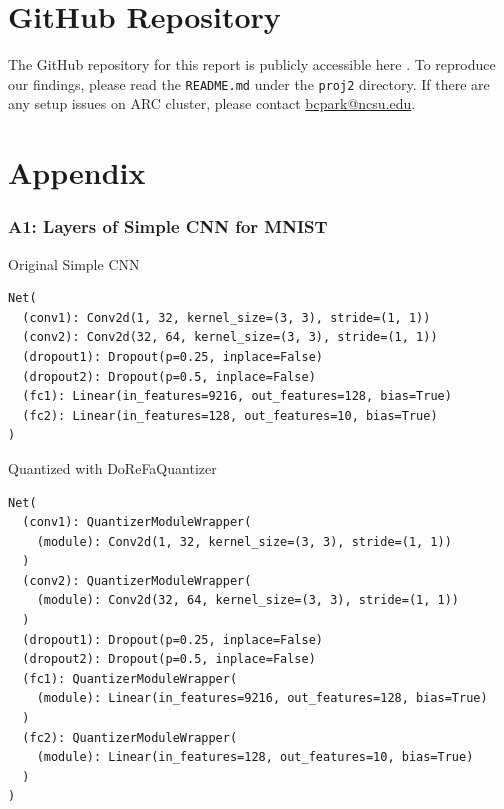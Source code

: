 \documentclass{article}
\begin{document}
\section{GitHub Repository}
The GitHub repository for this report is publicly accessible here \cite{proj2-repo}. To reproduce our findings, please read the \verb|README.md| under the \verb|proj2| directory. If there are any setup issues on ARC cluster, please contact \href{mailto:bcpark@ncsu.edu}{bcpark@ncsu.edu}.





\section{Appendix}

\subsubsection{A1: Layers of Simple CNN for MNIST}
\label{sec:A1}
Original Simple CNN
\begin{verbatim}
Net(
  (conv1): Conv2d(1, 32, kernel_size=(3, 3), stride=(1, 1))
  (conv2): Conv2d(32, 64, kernel_size=(3, 3), stride=(1, 1))
  (dropout1): Dropout(p=0.25, inplace=False)
  (dropout2): Dropout(p=0.5, inplace=False)
  (fc1): Linear(in_features=9216, out_features=128, bias=True)
  (fc2): Linear(in_features=128, out_features=10, bias=True)
)
\end{verbatim}

Quantized with DoReFaQuantizer
\begin{verbatim}
Net(
  (conv1): QuantizerModuleWrapper(
    (module): Conv2d(1, 32, kernel_size=(3, 3), stride=(1, 1))
  )
  (conv2): QuantizerModuleWrapper(
    (module): Conv2d(32, 64, kernel_size=(3, 3), stride=(1, 1))
  )
  (dropout1): Dropout(p=0.25, inplace=False)
  (dropout2): Dropout(p=0.5, inplace=False)
  (fc1): QuantizerModuleWrapper(
    (module): Linear(in_features=9216, out_features=128, bias=True)
  )
  (fc2): QuantizerModuleWrapper(
    (module): Linear(in_features=128, out_features=10, bias=True)
  )
)
\end{verbatim}
\end{document}
